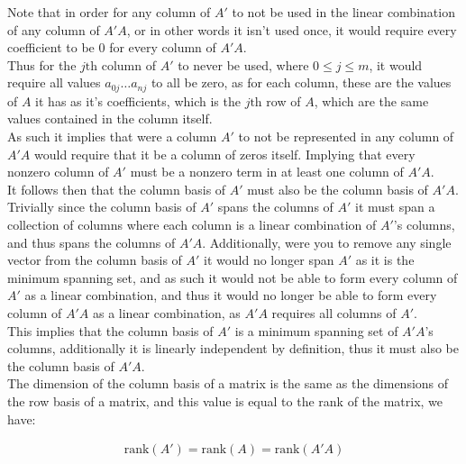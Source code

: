\documentclass[11pt]{article} %
\begin{document}
\begin{enumerate}
    Note that in order for any column of $A'$ to not be used in the linear combination of any column of $A'A$, or in other words it isn't used once, it would require every coefficient to be 0 for every column of $A'A$.\\
    Thus for the $j\text{th}$ column of $A'$ to never be used, where $0 \leq j \leq m$, it would require all values $a_{0j} \dots a_{nj}$ to all be zero, as for each column, these are the values of $A$ it has as it's coefficients, which is the $j\text{th}$ row of $A$, which are the same values contained in the column itself. \\
    As such it implies that were a column $A'$ to not be represented in any column of $A'A$ would require that it be a column of zeros itself. Implying that every nonzero column of $A'$ must be a nonzero term in at least one column of $A'A$. \\
    It follows then that the column basis of $A'$ must also be the column basis of $A'A$. Trivially since the column basis of $A'$ spans the columns of $A'$ it must span a collection of columns where each column is a linear combination of $A'$'s columns, and thus spans the columns of $A'A$. Additionally, were you to remove any single vector from the column basis of $A'$ it would no longer span $A'$ as it is the minimum spanning set, and as such it would not be able to form every column of $A'$ as a linear combination, and thus it would no longer be able to form every column of $A'A$ as a linear combination, as $A'A$ requires all columns of $A'$. \\
    This implies that the column basis of $A'$ is a minimum spanning set of $A'A$'s columns, additionally it is linearly independent by definition, thus it must also be the column basis of $A'A$. \\
    The dimension of the column basis of a matrix is the same as the dimensions of the row basis of a matrix, and this value is equal to the rank of the matrix, we have:

    \begin{align*}
        \text{rank}(A') = \text{rank}(A) = \text{rank}(A'A)
    \end{align*}

\end{enumerate}
\end{document}
